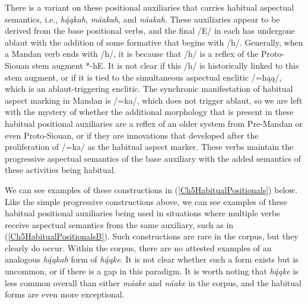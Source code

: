 There is a variant on these positional auxiliaries that carries habitual aspectual semantics, i.e., \textit{hą́ąkah}, \textit{máakah}, and \textit{náakah}. These auxiliaries appear to be derived from the base 
positional verbs, and the final /E/ in each has undergone ablaut with the addition of some formative that begins with /h/. Generally, when a Mandan verb ends with /h/, it is because that /h/ is a reflex of the Proto-Siouan stem augment *-hE. It is not clear if this /h/ is historically linked to this stem augment, or if it is tied to the simultaneous aspectual enclitic /=hąą/, which is an ablaut-triggering enclitic. The synchronic manifestation of habitual aspect marking in Mandan is /=ka/, which does not trigger ablaut, so we are left with the mystery of whether the additional morphology that is present in these habitual positional auxiliaries are a reflex of an older system from Pre-Mandan or even Proto-Siouan, or if they are innovations that developed after the proliferation of /=ka/ as the habitual aspect marker. These verbs maintain the progressive aspectual semantics of the base auxiliary with the added semantics of these activities being habitual. 

We can see examples of these constructions in (\ref{Ch5HabitualPositionals}) below. Like the simple progressive constructions above, we can see examples of these habitual positional auxiliaries being used in situations where multiple verbs receive aspectual semantics from the same auxiliary, such as in (\ref{Ch5HabitualPositionalsB}). Such constructions are rare in the corpus, but they clearly do occur. Within the corpus, there are no attested examples of an analogous \textit{hą́ąkah} form of \textit{hą́ąke}. It is not clear whether such a form exists but is uncommon, or if there is a gap in this paradigm. It is worth noting that \textit{hą́ąke} is less common overall than either \textit{máake} and \textit{náake} in the corpus, and the habitual forms are even more exceptional.

